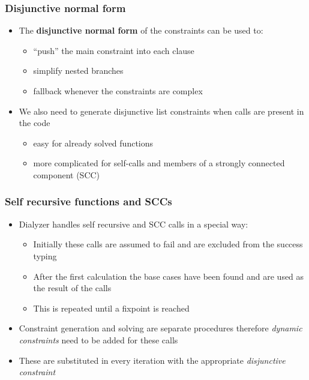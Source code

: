 \documentclass{beamer}
\begin{document}
\begin{frame}
  \frametitle{Disjunctive normal form}
  \begin{itemize}
  \item The \textbf{disjunctive normal form} of the constraints can be
    used to:
    \begin{itemize}
      \item ``push'' the main constraint into each clause
      \item simplify nested branches
      \item fallback whenever the constraints are complex
    \end{itemize} \pause
  \item We also need to generate disjunctive list constraints when
    calls are present in the code
    \begin{itemize}
    \item easy for already solved functions
    \item more complicated for self-calls and members of a strongly
      connected component (SCC)
    \end{itemize}
  \end{itemize}
\end{frame}

\begin{frame}
  \frametitle{Self recursive functions and SCCs}
  \begin{itemize}
  \item Dialyzer handles self recursive and SCC calls in a special
    way: \pause
    \begin{itemize}
    \item Initially these calls are assumed to fail and are excluded
      from the success typing
    \item After the first calculation the base cases have been found
      and are used as the result of the calls
    \item This is repeated until a fixpoint is reached
    \end{itemize} \pause
  \item Constraint generation and solving are separate procedures
    therefore \emph{dynamic constraints} need to be added for these
    calls \pause
  \item These are substituted in every iteration with the appropriate
    \emph{disjunctive constraint}
  \end{itemize}
\end{frame}
\end{document}
